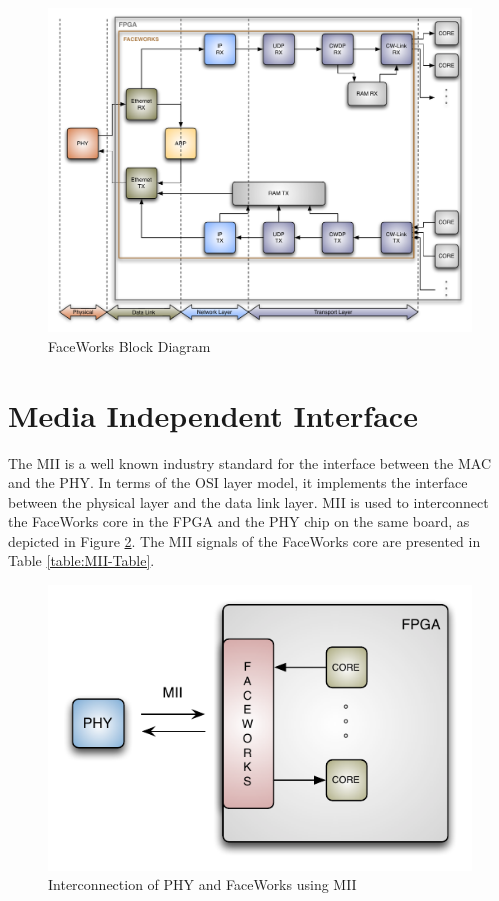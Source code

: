 \documentclass[defaultstyle,10pt,master,Helvetica]{thesis}
\begin{document}
\begin{figure}[h]
  \centering
      \includegraphics[scale=0.75,center]{Diagrams/FW.pdf}
  \caption{FaceWorks Block Diagram}\label{fig:FW-diag}
\end{figure}



\section{Media Independent Interface}

The \ac{MII}\cite{ieee802.3b} is a well known industry standard for the interface between the \ac{MAC} and the \ac{PHY}. In terms of the OSI layer model, it implements the interface between the physical layer and the data link layer. MII is used to interconnect the FaceWorks core in the \ac{FPGA} and the \ac{PHY} chip on the same board, as depicted in Figure \ref{fig:MII}. The MII signals of the FaceWorks core are presented in Table \ref{table:MII-Table}.

\begin{figure}[h]
  \centering
      \includegraphics[scale=1.25,center]{Diagrams/MII.pdf}
  \caption{Interconnection of \ac{PHY} and FaceWorks using MII}\label{fig:MII}
\end{figure}
\end{document}
